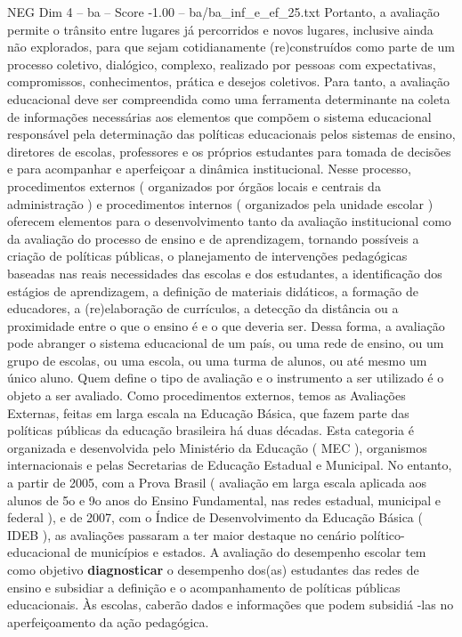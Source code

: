 \begin{textsample}{NEG Dim 4 – ba – Score -1.00 – ba/ba\_inf\_e\_ef\_25.txt}
Portanto, a avaliação permite o trânsito entre lugares já percorridos e novos lugares, inclusive ainda não explorados, para que sejam cotidianamente (re)construídos como parte de um processo coletivo, dialógico, complexo, realizado por pessoas com expectativas, compromissos, conhecimentos, prática e desejos coletivos.
Para tanto, a avaliação educacional deve ser compreendida como uma ferramenta determinante na coleta de informações necessárias aos elementos que compõem o sistema educacional responsável pela determinação das políticas educacionais pelos sistemas de ensino, diretores de escolas, professores e os próprios estudantes para tomada de decisões e para acompanhar e aperfeiçoar a dinâmica institucional.
Nesse processo, procedimentos externos ( organizados por órgãos locais e centrais da administração ) e procedimentos internos ( organizados pela unidade escolar ) oferecem elementos para o desenvolvimento tanto da avaliação institucional como da avaliação do processo de ensino e de aprendizagem, tornando possíveis a criação de políticas públicas, o planejamento de intervenções pedagógicas baseadas nas reais necessidades das escolas e dos estudantes, a identificação dos estágios de aprendizagem, a definição de materiais didáticos, a formação de educadores, a (re)elaboração de currículos, a detecção da distância ou a proximidade entre o que o ensino é e o que deveria ser.
Dessa forma, a avaliação pode abranger o sistema educacional de um país, ou uma rede de ensino, ou um grupo de escolas, ou uma escola, ou uma turma de alunos, ou até mesmo um único aluno.
Quem define o tipo de avaliação e o instrumento a ser utilizado é o objeto a ser avaliado.
Como procedimentos externos, temos as Avaliações Externas, feitas em larga escala na Educação Básica, que fazem parte das políticas públicas da educação brasileira há duas décadas.
Esta categoria é organizada e desenvolvida pelo Ministério da Educação ( MEC ), organismos internacionais e pelas Secretarias de Educação Estadual e Municipal.
No entanto, a partir de 2005, com a Prova Brasil ( avaliação em larga escala aplicada aos alunos de 5o e 9o anos do Ensino Fundamental, nas redes estadual, municipal e federal ), e de 2007, com o Índice de Desenvolvimento da Educação Básica ( IDEB ), as avaliações passaram a ter maior destaque no cenário político-educacional de municípios e estados.
A avaliação do desempenho escolar tem como objetivo \textbf{diagnosticar} o desempenho dos(as) estudantes das redes de ensino e subsidiar a definição e o acompanhamento de políticas públicas educacionais.
Às escolas, caberão dados e informações que podem subsidiá -las no aperfeiçoamento da ação pedagógica.

\end{textsample}
